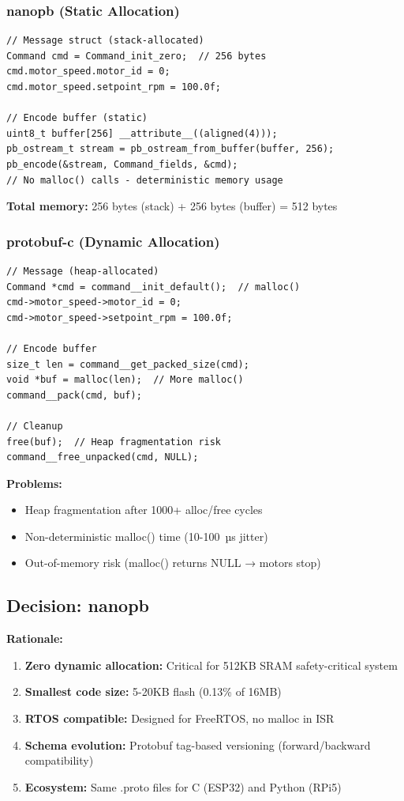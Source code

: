 \documentclass[12pt,letterpaper]{article}
\begin{document}
\subsubsection{nanopb (Static Allocation)}

\begin{lstlisting}[caption={nanopb Memory Usage}]
// Message struct (stack-allocated)
Command cmd = Command_init_zero;  // 256 bytes
cmd.motor_speed.motor_id = 0;
cmd.motor_speed.setpoint_rpm = 100.0f;

// Encode buffer (static)
uint8_t buffer[256] __attribute__((aligned(4)));
pb_ostream_t stream = pb_ostream_from_buffer(buffer, 256);
pb_encode(&stream, Command_fields, &cmd);
// No malloc() calls - deterministic memory usage
\end{lstlisting}

\textbf{Total memory:} 256 bytes (stack) + 256 bytes (buffer) = 512 bytes

\subsubsection{protobuf-c (Dynamic Allocation)}

\begin{lstlisting}[caption={protobuf-c Memory Usage}]
// Message (heap-allocated)
Command *cmd = command__init_default();  // malloc()
cmd->motor_speed->motor_id = 0;
cmd->motor_speed->setpoint_rpm = 100.0f;

// Encode buffer
size_t len = command__get_packed_size(cmd);
void *buf = malloc(len);  // More malloc()
command__pack(cmd, buf);

// Cleanup
free(buf);  // Heap fragmentation risk
command__free_unpacked(cmd, NULL);
\end{lstlisting}

\textbf{Problems:}
\begin{itemize}
    \item Heap fragmentation after 1000+ alloc/free cycles
    \item Non-deterministic malloc() time (10-100~µs jitter)
    \item Out-of-memory risk (malloc() returns NULL → motors stop)
\end{itemize}

\subsection{Decision: nanopb}

\textbf{Rationale:}
\begin{enumerate}
    \item \textbf{Zero dynamic allocation:} Critical for 512KB SRAM safety-critical system
    \item \textbf{Smallest code size:} 5-20KB flash (0.13\% of 16MB)
    \item \textbf{RTOS compatible:} Designed for FreeRTOS, no malloc in ISR
    \item \textbf{Schema evolution:} Protobuf tag-based versioning (forward/backward compatibility)
    \item \textbf{Ecosystem:} Same .proto files for C (ESP32) and Python (RPi5)
\end{enumerate}
\end{document}
